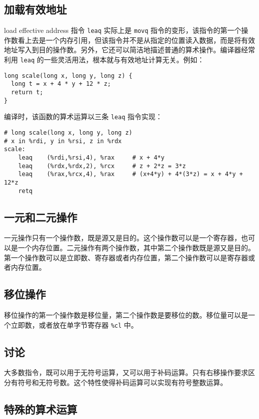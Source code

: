 \subsection{加载有效地址}

load effective address 指令 \verb|leaq| 实际上是 \verb|movq| 指令的变形，该指令的第一个操作数看上去是一个内存引用，但该指令并不是从指定的位置读入数据，而是将有效地址写入到目的操作数。另外，它还可以简洁地描述普通的算术操作。编译器经常利用 \verb|leaq| 的一些灵活用法，根本就与有效地址计算无关。例如：

\begin{verbatim}
long scale(long x, long y, long z) {
  long t = x + 4 * y + 12 * z;
  return t;
}
\end{verbatim}

编译时，该函数的算术运算以三条 \verb|leaq| 指令实现：

\begin{verbatim}
# long scale(long x, long y, long z)
# x in %rdi, y in %rsi, z in %rdx
scale:
    leaq    (%rdi,%rsi,4), %rax     # x + 4*y
    leaq    (%rdx,%rdx,2), %rcx     # z + 2*z = 3*z
    leaq    (%rax,%rcx,4), %rax     # (x+4*y) + 4*(3*z) = x + 4*y + 12*z
    retq
\end{verbatim}

\subsection{一元和二元操作}

一元操作只有一个操作数，既是源又是目的。这个操作数可以是一个寄存器，也可以是一个内存位置。二元操作有两个操作数，其中第二个操作数既是源又是目的。第一个操作数可以是立即数、寄存器或者内存位置，第二个操作数可以是寄存器或者内存位置。

\subsection{移位操作}

移位操作的第一个操作数是移位量，第二个操作数是要移位的数。移位量可以是一个立即数，或者放在单字节寄存器 \verb|%cl| 中。

\subsection{讨论}

大多数指令，既可以用于无符号运算，又可以用于补码运算。只有右移操作要求区分有符号和无符号数。这个特性使得补码运算可以实现有符号整数运算。

\subsection{特殊的算术运算}

